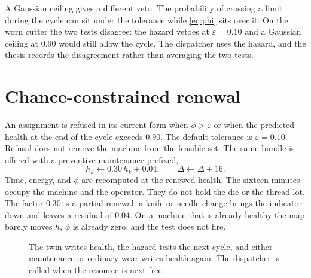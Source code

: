 \documentclass[10pt,a4paper]{article}
\begin{document}
A Gaussian ceiling gives a different veto. The probability of crossing a limit during the cycle can sit under the tolerance while \eqref{eq:phi} sits over it. On the worn cutter the two tests disagree: the hazard vetoes at \(\varepsilon = 0.10\) and a Gaussian ceiling at \(0.90\) would still allow the cycle. The dispatcher uses the hazard, and the thesis records the disagreement rather than averaging the two tests.

\section{Chance-constrained renewal}

An assignment is refused in its current form when \(\phi > \varepsilon\) or when the predicted health at the end of the cycle exceeds \(0.90\). The default tolerance is \(\varepsilon = 0.10\). Refusal does not remove the machine from the feasible set. The same bundle is offered with a preventive maintenance prefixed,
\begin{equation}
h_k \leftarrow 0.30\, h_k + 0.04,
\qquad
\Delta \leftarrow \Delta + 16.
\label{eq:pm}
\end{equation}
Time, energy, and \(\phi\) are recomputed at the renewed health. The sixteen minutes occupy the machine and the operator. They do not hold the die or the thread lot. The factor \(0.30\) is a partial renewal: a knife or needle change brings the indicator down and leaves a residual of \(0.04\). On a machine that is already healthy the map barely moves \(h\), \(\phi\) is already zero, and the test does not fire.

\begin{figure}[ht]
\centering
{}
\caption{The twin writes health, the hazard tests the next cycle, and either maintenance or ordinary wear writes health again. The dispatcher is called when the resource is next free.}
\label{fig:loop}
\end{figure}
\end{document}
